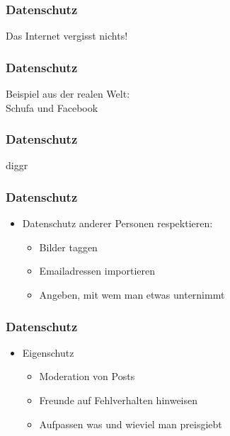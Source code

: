 \documentclass[12pt]{beamer}
\begin{document}
\begin{frame}
  \frametitle{Datenschutz}

  \begin{center} \Large
   Das Internet vergisst nichts!
  \end{center}
\end{frame}

\begin{frame}
  \frametitle{Datenschutz}

  \begin{center} \Large
   Beispiel aus der realen Welt:\\ Schufa und Facebook
  \end{center}
\end{frame}

\begin{frame}
  \frametitle{Datenschutz}

  \begin{center} \Large
   diggr
  \end{center}
\end{frame}

\begin{frame}
  \frametitle{Datenschutz}

  \begin{itemize}
    \item Datenschutz anderer Personen respektieren:
      \begin{itemize}
        \item<2->Bilder taggen
        \item<3->Emailadressen importieren
        \item<4->Angeben, mit wem man etwas unternimmt
      \end{itemize}
  \end{itemize}
\end{frame}

\begin{frame}
  \frametitle{Datenschutz}

  \begin{itemize}
    \item Eigenschutz
      \begin{itemize}
        \item<2->Moderation von Posts
        \item<3->Freunde auf Fehlverhalten hinweisen
        \item<4->Aufpassen was und wieviel man preisgiebt
      \end{itemize}
  \end{itemize}
\end{frame}
\end{document}
